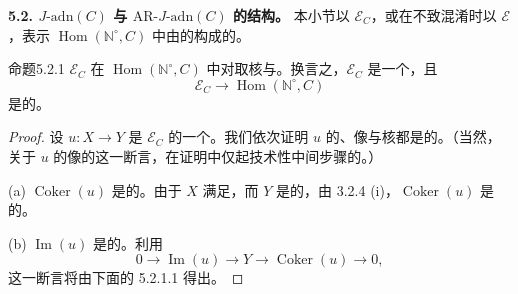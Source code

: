 \textbf{5.2. $J\text{-}\mathrm{adn}(C)$ 与 $\mathrm{AR}\text{-}J\text{-}\mathrm{adn}(C)$ 的结构。}
本小节以 $\mathscr E_C$，或在不致混淆时以 $\mathscr E$，表示 $\operatorname{Hom}(\mathbb N^\circ,C)$ 中由的构成的。

\begin{SGAresult}{命题}{5.2.1}
 $\mathscr E_C$ 在 $\operatorname{Hom}(\mathbb N^\circ,C)$ 中对取核与。换言之，$\mathscr E_C$ 是一个，且
\[
\mathscr E_C\longrightarrow\operatorname{Hom}(\mathbb N^\circ,C)
\]
是的。
\end{SGAresult}
\begin{proof}
设 $u:X\to Y$ 是 $\mathscr E_C$ 的一个。我们依次证明 $u$ 的、像与核都是的。（当然，关于 $u$ 的像的这一断言，在证明中仅起技术性中间步骤的。）

(a) $\operatorname{Coker}(u)$ 是的。由于 $X$ 满足，而 $Y$ 是的，由 3.2.4 (i)，$\operatorname{Coker}(u)$ 是的。

(b) $\operatorname{Im}(u)$ 是的。利用
\[
0\longrightarrow\operatorname{Im}(u)\longrightarrow Y\longrightarrow\operatorname{Coker}(u)\longrightarrow0,
\]
这一断言将由下面的 5.2.1.1 得出。
\end{proof}


